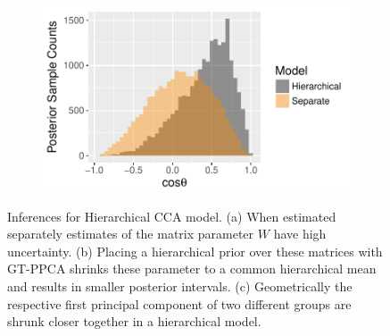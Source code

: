 \documentclass{article}
\begin{document}
\begin{figure}
\begin{subfigure}[b]{0.22\textwidth}
        \caption{}
        \label{fig:hierPosteriors}
    \end{subfigure}
    ~ %
    \begin{subfigure}[b]{0.37\textwidth}
        \includegraphics[width=\textwidth]{posteriorCosAngle.pdf}
        \caption{}
        \label{fig:posteriorCosAngle}
    \end{subfigure}
    \caption{Inferences for Hierarchical CCA model. (a) When estimated separately estimates of the matrix parameter $W$ have high uncertainty. (b) Placing a hierarchical prior over these matrices with GT-PPCA shrinks these parameter to a common hierarchical mean and results in smaller posterior intervals. (c) Geometrically the respective first principal component of two different groups are shrunk closer together in a hierarchical model.}\label{fig:ccaResults}
\end{figure}

\end{document}
